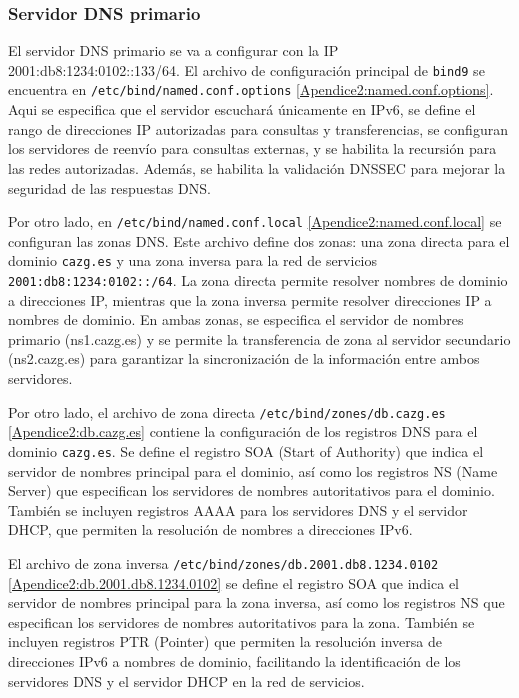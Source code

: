 \subsubsection*{Servidor DNS primario}
El servidor DNS primario se va a configurar con la IP 2001:db8:1234:0102::133/64.
El archivo de configuración principal de \texttt{bind9} se encuentra en \texttt{/etc/bind/named.conf.options} \ref{Apendice2:named.conf.options}. Aqui se especifica que el servidor escuchará únicamente en IPv6, se define el rango de direcciones IP autorizadas para consultas y transferencias, se configuran los servidores de reenvío para consultas externas, y se habilita la recursión para las redes autorizadas. Además, se habilita la validación DNSSEC para mejorar la seguridad de las respuestas DNS.

\vspace{0.5cm}
Por otro lado, en \texttt{/etc/bind/named.conf.local} \ref{Apendice2:named.conf.local} se configuran las zonas DNS. Este archivo define dos zonas: una zona directa para el dominio \texttt{cazg.es} y una zona inversa para la red de servicios \texttt{2001:db8:1234:0102::/64}. La zona directa permite resolver nombres de dominio a direcciones IP, mientras que la zona inversa permite resolver direcciones IP a nombres de dominio. En ambas zonas, se especifica el
servidor de nombres primario (ns1.cazg.es) y se permite la transferencia de zona al servidor secundario (ns2.cazg.es) para garantizar la sincronización de la información entre ambos servidores.

\vspace{0.5cm}
Por otro lado, el archivo de zona directa \texttt{/etc/bind/zones/db.cazg.es} \ref{Apendice2:db.cazg.es} contiene la configuración de los registros DNS para el dominio \texttt{cazg.es}. Se define el registro SOA (Start of Authority) que indica el servidor de nombres principal para el dominio, así como los registros NS (Name Server) que especifican los servidores de nombres autoritativos para el dominio. También se incluyen registros AAAA para los servidores DNS y el servidor DHCP, que permiten la resolución de nombres a direcciones IPv6.

\vspace{0.5cm}
El archivo de zona inversa \texttt{/etc/bind/zones/db.2001.db8.1234.0102} \ref{Apendice2:db.2001.db8.1234.0102} se define el registro SOA que indica el servidor de nombres principal para la zona inversa, así como los registros NS que especifican los servidores de nombres autoritativos para la zona. También se incluyen registros PTR (Pointer) que permiten la resolución inversa de direcciones IPv6 a nombres de dominio, facilitando la identificación de los servidores DNS y el servidor DHCP en la red de servicios.

